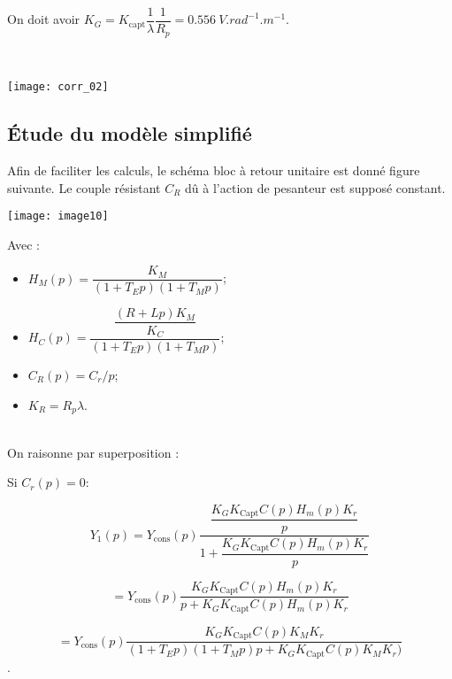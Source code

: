 \begin{multicols}{2}
\begin{corrige}
On doit avoir $K_G=K_{\text{capt}} \dfrac{1}{\lambda} \dfrac{1}{R_p}=\SI{0,556}{V.rad^{-1}.m^{-1}}$.
\end{corrige}
\else
\fi

\ifprof
\begin{corrige} ~\\

\begin{center}
\texttt{[image: corr\_02]}
\end{center} 

\end{corrige}
\else
\fi

\subsection*{Étude du modèle simplifié}
\ifprof
\else
Afin de faciliter les calculs, le schéma bloc à retour unitaire est donné figure suivante. Le couple résistant $C_R$ dû à l'action de pesanteur est supposé constant.
 
 \begin{center}
\texttt{[image: image10]}
\end{center} 


Avec :
\begin{itemize}
\item $H_M (p)=\dfrac{K_M}{(1+T_E p)(1+T_M p)}$;
\item $H_C (p)=\dfrac{\dfrac{\left(R+Lp\right)K_M}{K_C}}{(1+T_E p)(1+T_M p)}$;
\item $C_R (p)=C_r/p$;
\item $K_R=R_p \lambda$.
\end{itemize}
\fi

\ifprof
\begin{corrige}~\\
On raisonne par superposition :

Si $C_r (p)=0$: 

$$Y_1 (p)
=Y_{\text{cons}}(p) \dfrac{\dfrac{K_G K_{\text{Capt}} C(p) H_m (p) K_r}{p}}{1+\dfrac{K_G K_{\text{Capt}} C(p) H_m (p) K_r}{p}}$$

$$
=Y_{\text{cons}} (p) \dfrac{K_G K_{\text{Capt}} C(p) H_m (p) K_r}{p+K_G K_{\text{Capt}} C(p) H_m (p) K_r } 
$$

$$
=Y_{\text{cons}} (p) \dfrac{K_G K_{\text{Capt}} C(p) K_M  K_r}{(1+T_E p)(1+T_M p)p+K_G K_{\text{Capt}} C(p) K_M K_r )}$$.

\end{corrige}


\end{multicols}
